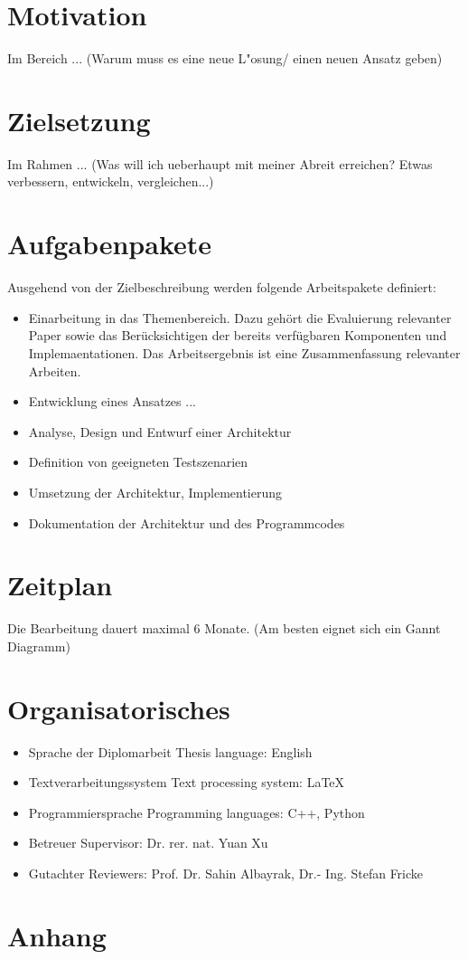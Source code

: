 \chapter{Motivation}

Im Bereich ... (Warum muss es eine neue L"osung/ einen neuen Ansatz geben) 






\chapter{Zielsetzung}
Im Rahmen ... (Was will ich ueberhaupt mit meiner Abreit erreichen? Etwas verbessern, entwickeln, vergleichen...)


\chapter{Aufgabenpakete}
Ausgehend von der Zielbeschreibung werden folgende Arbeitspakete definiert:

\begin{itemize}
	\item Einarbeitung in das Themenbereich. Dazu gehört die Evaluierung relevanter Paper sowie das Berücksichtigen der bereits verfügbaren Komponenten und Implemaentationen. Das Arbeitsergebnis ist eine Zusammenfassung relevanter Arbeiten.

	\item Entwicklung eines Ansatzes ...

	\item Analyse, Design und Entwurf einer Architektur

	\item Definition von geeigneten Testszenarien

	\item Umsetzung der Architektur, Implementierung

	\item Dokumentation der Architektur und des Programmcodes
\end{itemize}

	
\chapter{Zeitplan}
Die Bearbeitung dauert maximal 6 Monate. (Am besten eignet sich ein Gannt Diagramm)

\chapter{Organisatorisches}
\begin{itemize}
	\item {\color{magenta} Sprache der Diplomarbeit} Thesis language: English
	\item {\color{magenta} Textverarbeitungssystem} Text processing system: LaTeX
	\item {\color{magenta} Programmiersprache} Programming languages: C++, Python
	\item {\color{magenta} Betreuer} Supervisor: Dr. rer. nat. Yuan Xu
	\item {\color{magenta} Gutachter} Reviewers: Prof. Dr. Sahin Albayrak, Dr.- Ing. Stefan Fricke
\end{itemize}

\chapter{Anhang}



